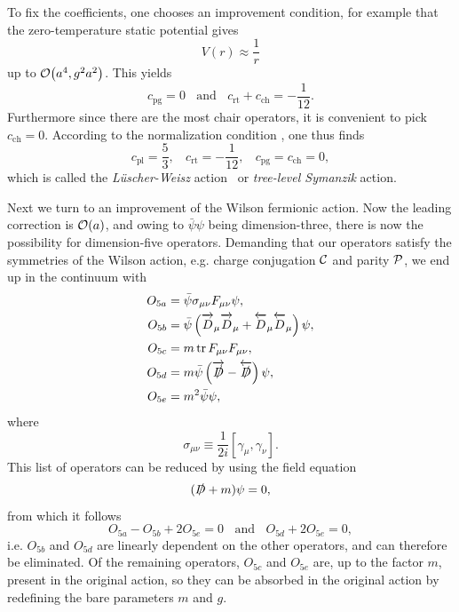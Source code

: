 To fix the coefficients, one chooses an improvement condition, for example
that the zero-temperature static potential gives
\begin{equation}
  V(r)\approx\frac{1}{r}
\end{equation}
up to $\order{a^4,g^2a^2}$. This yields 
\begin{equation}
  c_\text{pg}=0~~~~\text{and}~~~~c_\text{rt}+c_\text{ch}=-\frac{1}{12}.
\end{equation}
Furthermore since there are the most chair operators, it is convenient
to pick $c_\text{ch}=0$. According to the normalization condition
, one thus finds
\begin{equation}
  c_\text{pl}=\frac{5}{3},~~~~c_\text{rt}=-\frac{1}{12},~~~~
    c_\text{pg}=c_\text{ch}=0,
\end{equation}
which is called the {\it L\"uscher-Weisz} action~\cite{luscher_shell_1985}
 or {\it tree-level Symanzik} action.

Next we turn to an improvement of the Wilson fermionic action. Now the leading
correction is $\order{a}$, and owing to $\bar{\psi}\psi$ being dimension-three,
there is now the possibility for dimension-five operators. Demanding that
our operators satisfy the symmetries of the Wilson action, e.g.
charge conjugation $\mathcal{C}$ and parity $\mathcal{P}$, we end up in the
continuum with 
\begin{equation}\begin{aligned}
  O_{5a}&=\bar\psi \sigma_{\mu\nu}F_{\mu\nu}\psi, \\
  O_{5b}&=\bar\psi\left(\overrightarrow{D\strut}_\mu\overrightarrow{D\strut}_\mu
                          +\overleftarrow{D\strut}_\mu\overleftarrow{D\strut}_\mu\right)\psi,\\ 
  O_{5c}&=m \tr F_{\mu\nu}F_{\mu\nu},\\
  O_{5d}&=m\bar\psi\left(\overrightarrow{\slashed{D}\strut}
                         -\overleftarrow{\slashed{D}\strut}\right)\psi,\\
  O_{5e}&=m^2 \bar\psi \psi,
\end{aligned}\end{equation}
where
\begin{equation}
  \sigma_{\mu\nu}\equiv\frac{1}{2i}[\gamma_\mu,\gamma_\nu].
\end{equation}
This list of operators can be reduced by using the field equation
\begin{equation}
 (\slashed{D}+m)\psi=0,
\end{equation}
from which it follows
\begin{equation}
  O_{5a}-O_{5b}+2O_{5e}=0~~~~\text{and}~~~~O_{5d}+2O_{5e}=0,
\end{equation}
i.e. $O_{5b}$ and $O_{5d}$ are linearly dependent on the other operators,
and can therefore be eliminated. Of the remaining operators, $O_{5c}$ and
$O_{5e}$ are, up to the factor $m$, present in the original action, so
they can be absorbed in the original action by redefining the bare
parameters $m$ and $g$.

